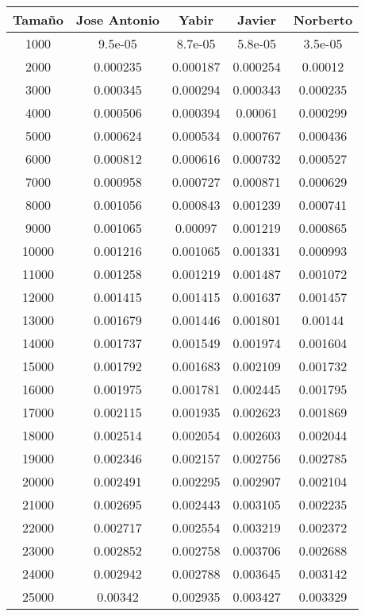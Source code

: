 \documentclass{article}
\begin{document}
\newpage
{}

\begin{tabular}{ | c | c  | c | c | c | }
  \hline
   Tama\~no & Jose Antonio & Yabir & Javier & Norberto\\ 
   \hline
1000	&	9.5e-05	&	8.7e-05	&	5.8e-05	&	3.5e-05	\\
2000	&	0.000235	&	0.000187	&	0.000254	&	0.00012	\\
3000	&	0.000345	&	0.000294	&	0.000343	&	0.000235	\\
4000	&	0.000506	&	0.000394	&	0.00061	&	0.000299	\\
5000	&	0.000624	&	0.000534	&	0.000767	&	0.000436	\\
6000	&	0.000812	&	0.000616	&	0.000732	&	0.000527	\\
7000	&	0.000958	&	0.000727	&	0.000871	&	0.000629	\\
8000	&	0.001056	&	0.000843	&	0.001239	&	0.000741	\\
9000	&	0.001065	&	0.00097	&	0.001219	&	0.000865	\\
10000	&	0.001216	&	0.001065	&	0.001331	&	0.000993	\\
11000	&	0.001258	&	0.001219	&	0.001487	&	0.001072	\\
12000	&	0.001415	&	0.001415	&	0.001637	&	0.001457	\\
13000	&	0.001679	&	0.001446	&	0.001801	&	0.00144	\\
14000	&	0.001737	&	0.001549	&	0.001974	&	0.001604	\\
15000	&	0.001792	&	0.001683	&	0.002109	&	0.001732	\\
16000	&	0.001975	&	0.001781	&	0.002445	&	0.001795	\\
17000	&	0.002115	&	0.001935	&	0.002623	&	0.001869	\\
18000	&	0.002514	&	0.002054	&	0.002603	&	0.002044	\\
19000	&	0.002346	&	0.002157	&	0.002756	&	0.002785	\\
20000	&	0.002491	&	0.002295	&	0.002907	&	0.002104	\\
21000	&	0.002695	&	0.002443	&	0.003105	&	0.002235	\\
22000	&	0.002717	&	0.002554	&	0.003219	&	0.002372	\\
23000	&	0.002852	&	0.002758	&	0.003706	&	0.002688	\\
24000	&	0.002942	&	0.002788	&	0.003645	&	0.003142	\\
25000	&	0.00342	&	0.002935	&	0.003427	&	0.003329	\\

  \hline
 \end{tabular}
 
\end{document}
